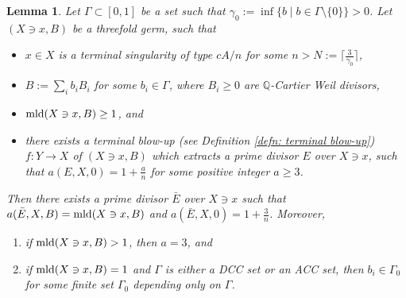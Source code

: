 \documentclass[11pt]{amsart}
\numberwithin{equation}{section}
\newcommand\han[1]{\todo[color=yellow!40]{#1}} %
\newcommand{\Qq}{\mathbb{Q}}
\newcommand{\mld}{{\rm{mld}}}
\newcommand{\Ii}{{\Gamma}}
\newtheorem{lem}[thm]{Lemma}
\theoremstyle{definition}
\theoremstyle{definition}
\begin{document}
\begin{lem}\label{lem: finiteness of description of terminal threefold singularities}
Let $\Ii\subset [0,1]$ be a set such that $\gamma_0:=\inf \{b\mid b\in\Ii\setminus\{0\}\}>0$. Let $(X\ni x,B)$ be a threefold germ, such that 
\begin{itemize}
    \item $x\in X$ is a terminal singularity of type $cA/n$ for some $n>N:=\lceil\frac{3}{\gamma_0}\rceil$,
    \item $B:=\sum_{i} b_iB_i$ for some $b_i\in \Ii$, where $B_i\geq 0$ are $\Qq$-Cartier Weil divisors, %
    \item $\mld(X\ni x,B)\geq 1$, and
    \item there exists a terminal blow-up (see Definition \ref{defn: terminal blow-up}) $f: Y\to X$ of $(X\ni x,B)$ which extracts a prime divisor $E$ over $X\ni x$, such that $a(E,X,0)=1+\frac{a}{n}$ for some positive integer $a\geq 3$.
\end{itemize}
Then there exists a prime divisor $\bar E$ over $X\ni x$ such that $a(\bar E,X,B)=\mld(X\ni x, B)$ and $a(\bar E,X,0)=1+\frac{3}{n}$. Moreover,
\begin{enumerate}
\item if $\mld(X\ni x, B)>1$, then $a=3$, and 
\item if $\mld(X\ni x,B)=1$ and $\Gamma$ is either a DCC set or an ACC set, then $b_i\in\Gamma_0$ for some  finite set $\Gamma_0$ depending only on $\Gamma$.
\end{enumerate}
\end{lem}
\end{document}
